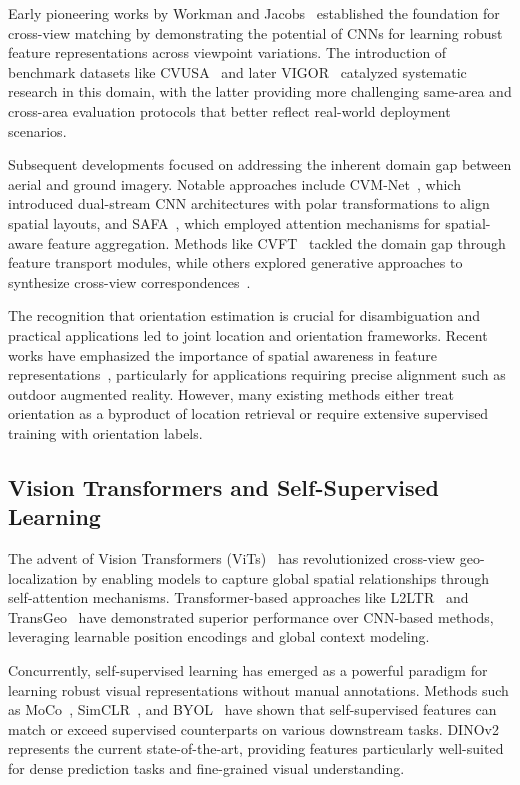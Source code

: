 \documentclass{bmvc2k}
\begin{document}
Early pioneering works by Workman and Jacobs~\cite{workman2015predicting,workman2015learning} established the foundation for cross-view matching by demonstrating the potential of CNNs for learning robust feature representations across viewpoint variations. The introduction of benchmark datasets like CVUSA~\cite{workman2015predicting} and later VIGOR~\cite{zhu2021vigor} catalyzed systematic research in this domain, with the latter providing more challenging same-area and cross-area evaluation protocols that better reflect real-world deployment scenarios.

Subsequent developments focused on addressing the inherent domain gap between aerial and ground imagery. Notable approaches include CVM-Net~\cite{hu2018cvm}, which introduced dual-stream CNN architectures with polar transformations to align spatial layouts, and SAFA~\cite{NEURIPS2019_ba2f0015}, which employed attention mechanisms for spatial-aware feature aggregation. Methods like CVFT~\cite{shi2019optimalfeaturetransportcrossview} tackled the domain gap through feature transport modules, while others explored generative approaches to synthesize cross-view correspondences~\cite{regmi2018cross}.

The recognition that orientation estimation is crucial for disambiguation and practical applications led to joint location and orientation frameworks. Recent works have emphasized the importance of spatial awareness in feature representations~\cite{shi2020ilookingatjoint}, particularly for applications requiring precise alignment such as outdoor augmented reality. However, many existing methods either treat orientation as a byproduct of location retrieval or require extensive supervised training with orientation labels.

\subsection{Vision Transformers and Self-Supervised Learning}

The advent of Vision Transformers (ViTs)~\cite{dosovitskiy2020image} has revolutionized cross-view geo-localization by enabling models to capture global spatial relationships through self-attention mechanisms. Transformer-based approaches like L2LTR~\cite{yang2021cross} and TransGeo~\cite{wang2021multi} have demonstrated superior performance over CNN-based methods, leveraging learnable position encodings and global context modeling.

Concurrently, self-supervised learning has emerged as a powerful paradigm for learning robust visual representations without manual annotations. Methods such as MoCo~\cite{he2020momentum}, SimCLR~\cite{chen2020simple}, and BYOL~\cite{grill2020bootstrap} have shown that self-supervised features can match or exceed supervised counterparts on various downstream tasks. DINOv2~\cite{oquab2023dinov2} represents the current state-of-the-art, providing features particularly well-suited for dense prediction tasks and fine-grained visual understanding.
\end{document}
